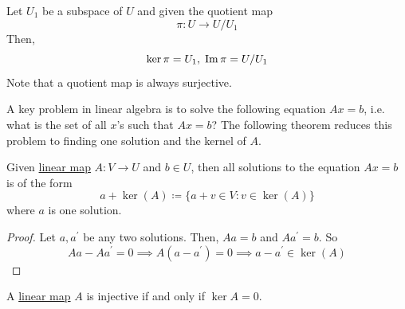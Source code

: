 	\begin{example}
	  \label{ex:image-and-kernel-of-quotient-map}
    Let $U_1$ be a subspace of $U$ and given the quotient map
    \begin{equation}
      \pi: U \to U / U_1
    \end{equation}
    Then, 
    \begin{equation}
      \text{ker}\,\pi = U_1, \; \operatorname{Im}{\pi} = U / U_1
    \end{equation}
    Note that a quotient map is always surjective. 
  \end{example} 
	
	A key problem in linear algebra is to solve the following equation $Ax = b$, i.e. what is the set of all $x$'s such that $Ax = b$? The following theorem reduces this problem to finding one solution and the kernel of $A$. 

	\begin{theorem}[]
	  \label{thm:linear-map-solutions-equation-form}
    Given \hyperref[def:linear_map]{linear map} $A: V \to U$ and $b \in U$, then all solutions to the equation $Ax = b$ is of the form 
		\begin{equation}
			a + \ker(A) \coloneqq \{a + v \in V \colon v \in \ker(A)\}
		\end{equation}
		where $a$ is one solution. 
  \end{theorem}
	\begin{proof}
		Let $a, a^\prime$ be any two solutions. Then, $Aa = b$ and $A a^\prime = b$. So 
		\begin{equation}
		  A a - A a^\prime = 0 \implies A(a - a^\prime) = 0 \implies a - a^\prime \in \ker(A)
		\end{equation}
	\end{proof}

  \begin{corollary}
    \label{thm:injectivity-via-the-kernel}
    A \hyperref[def:linear_map]{linear map} $A$ is injective if and only if $\ker A = 0$.
  \end{corollary}

